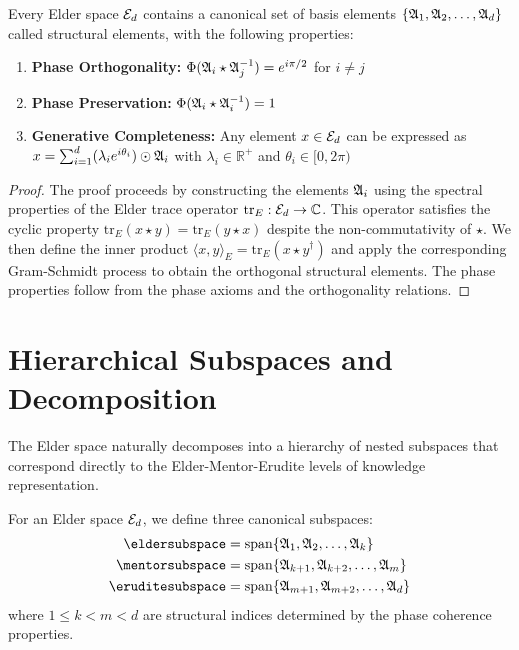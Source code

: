 \begin{theorem}
Every Elder space $\mathcal{E}_{d}$ contains a canonical set of basis elements $\{\mathfrak{A}_{1}, \mathfrak{A}_{2}, \ldots, \mathfrak{A}_{d}\}$ called structural elements, with the following properties:
\begin{enumerate}
    \item \textbf{Phase Orthogonality:} $\Phi(\mathfrak{A}_{i} \star \mathfrak{A}_{j}^{-1}) = e^{i\pi/2}$ for $i \neq j$
    \item \textbf{Phase Preservation:} $\Phi(\mathfrak{A}_{i} \star \mathfrak{A}_{i}^{-1}) = 1$
    \item \textbf{Generative Completeness:} Any element $x \in \mathcal{E}_{d}$ can be expressed as $x = \sum_{i=1}^{d} (\lambda_i e^{i\theta_i}) \odot \mathfrak{A}_{i}$ with $\lambda_i \in \mathbb{R}^+$ and $\theta_i \in [0, 2\pi)$
\end{enumerate}
\end{theorem}

\begin{proof}
The proof proceeds by constructing the elements $\mathfrak{A}_{i}$ using the spectral properties of the Elder trace operator $\mathrm{tr}_E: \mathcal{E}_{d} \rightarrow \mathbb{C}$. This operator satisfies the cyclic property $\mathrm{tr}_E(x \star y) = \mathrm{tr}_E(y \star x)$ despite the non-commutativity of $\star$. We then define the inner product $\langle x, y \rangle_E = \mathrm{tr}_E(x \star y^{\dagger})$ and apply the corresponding Gram-Schmidt process to obtain the orthogonal structural elements. The phase properties follow from the phase axioms and the orthogonality relations.
\end{proof}

\section{Hierarchical Subspaces and Decomposition}

The Elder space naturally decomposes into a hierarchy of nested subspaces that correspond directly to the Elder-Mentor-Erudite levels of knowledge representation.

\begin{definition}
For an Elder space $\mathcal{E}_{d}$, we define three canonical subspaces:
\begin{align}
    \eldersubspace &= \mathrm{span}\{\elderstructure{1}, \elderstructure{2}, \ldots, \elderstructure{k}\} \\
    \mentorsubspace &= \mathrm{span}\{\elderstructure{k+1}, \elderstructure{k+2}, \ldots, \elderstructure{m}\} \\
    \eruditesubspace &= \mathrm{span}\{\elderstructure{m+1}, \elderstructure{m+2}, \ldots, \elderstructure{d}\}
\end{align}
where $1 \leq k < m < d$ are structural indices determined by the phase coherence properties.
\end{definition}

